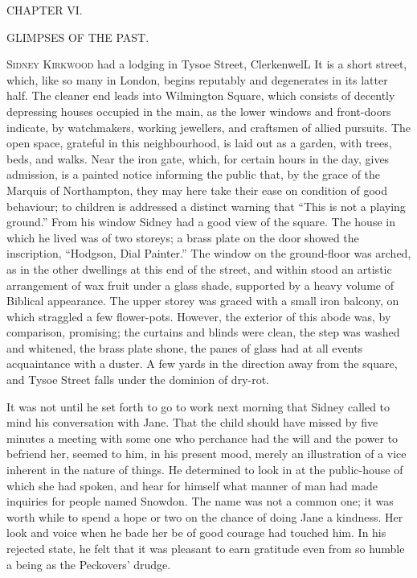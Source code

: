 {}

{CHAPTER VI.}

GLIMPSES OF THE PAST.

\textsc{Sidney Kirkwood} had a lodging in Tysoe Street, ClerkenwelL It
is a short street, which, like so many in London, begins reputably and
degenerates in its latter half. The cleaner end leads into Wilmington
Square, which consists of decently depressing houses occupied in the
main, as the lower windows and front-doors indicate, by watchmakers,
working jewellers, and craftsmen of allied pursuits. The open space,
grateful in this neighbourhood, is laid out as a garden, with trees,
beds, and walks. Near the iron gate, which, for certain hours in the
day, gives admission, is a painted notice informing the public that, by
the grace of the Marquis of Northampton, they may here take their ease
on condition of good behaviour; to children {}is addressed a distinct
warning that ``This is not a playing ground.'' From his window Sidney
had a good view of the square. The house in which he lived was of two
storeys; a brass plate on the door showed the inscription, ``Hodgson,
Dial Painter.'' The window on the ground-floor was arched, as in the
other dwellings at this end of the street, and within stood an artistic
arrangement of wax fruit under a glass shade, supported by a heavy
volume of Biblical appearance. The upper storey was graced with a small
iron balcony, on which straggled a few flower-pots. However, the
exterior of this abode was, by comparison, promising; the curtains and
blinds were clean, the step was washed and whitened, the brass plate
shone, the panes of glass had at all events acquaintance with a duster.
A few yards in the direction away from the square, and Tysoe Street
falls under the dominion of dry-rot.

It was not until he set forth to go to work next morning that Sidney
called to mind his conversation with Jane. That the child should {}have
missed by five minutes a meeting with some one who perchance had the
will and the power to befriend her, seemed to him, in his present mood,
merely an illustration of a vice inherent in the nature of things. He
determined to look in at the public-house of which she had spoken, and
hear for himself what manner of man had made inquiries for people named
Snowdon. The name was not a common one; it was worth while to spend a
hope or two on the chance of doing Jane a kindness. Her look and voice
when he bade her be of good courage had touched him. In his rejected
state, he felt that it was pleasant to earn gratitude even from so
humble a being as the Peckovers' drudge.

